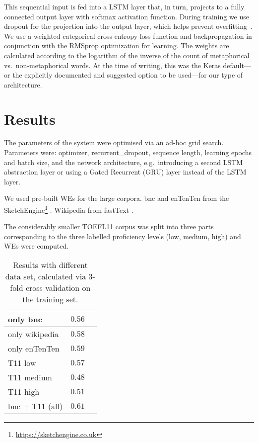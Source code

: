 \documentclass[11pt,a4paper]{article}
\begin{document}
This sequential input is fed into a LSTM layer that, in turn, projects to a
fully connected output layer with softmax activation function.
During training we use dropout for the projection into the output layer,
which helps prevent overfitting~\cite{Srivastava2014}.
We use a weighted categorical cross-entropy loss function and backpropagation in
conjunction with the RMSprop optimization for learning.  The weights are calculated according to the logarithm of the inverse of the count of metaphorical vs.~non-metaphorical words.
At the time of writing, this was the Keras default---or the explicitly
documented and suggested option to be used---for our type of architecture. 


\section{Results} %
\label{sec:results}

The parameters of the system were optimised via an ad-hoc grid search. Parameters were:
optimizer, recurrent\_dropout, sequence length, learning epochs and batch size, and the network architecture, e.g.~introducing a second LSTM abstraction layer or using a Gated Recurrent (GRU) layer instead of the LSTM layer.

We used pre-built WEs for the large corpora. bnc and enTenTen \cite{1120431} from the SketchEngine\footnote{\url{https://sketchengine.co.uk}} \cite{DBLP:journals/corr/BojanowskiGJM16}. Wikipedia from fastText \cite{mikolov2018advances}. 

The considerably smaller TOEFL11 corpus was split into three parts corresponding to the three labelled proficiency levels (low, medium, high) and WEs were computed.

\begin{table}[h]
\begin{center}
\begin{tabular}{l|r|r}
\hline
only bnc   		& $0.56$ \\ \hline
only wikipedia 	& $0.58$ \\ \hline
only enTenTen	& $0.59$ \\ \hline
\hline
T11 low 		& $0.57$ \\ \hline
T11 medium		& $0.48$ \\ \hline
T11 high		& $0.51$ \\ \hline
\hline
bnc + T11 (all) & $0.61$ \\ \hline
\end{tabular}
\end{center}
\caption{\label{tab:results}Results with different data set, calculated via 3-fold cross validation on the training set.} 
\end{table}
\end{document}
